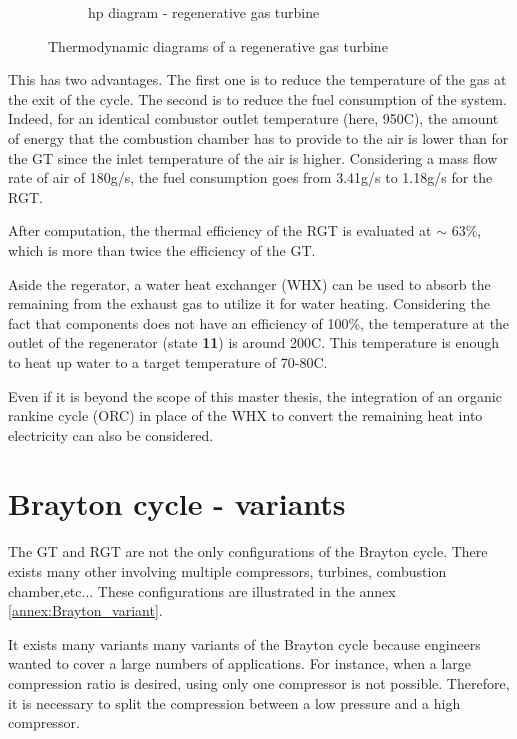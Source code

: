 \begin{figure}[h]
\begin{subfigure}[b]{0.4\textwidth}
         \caption{hp diagram - regenerative gas turbine}
         \label{fig:C4_hp_RGT}
     \end{subfigure}
        \caption{Thermodynamic diagrams of a regenerative gas turbine}
        \label{fig:C4_thermo_diagram_RGT}
\end{figure}
\newpage
This has two advantages. The first one is to reduce the temperature of the gas at the exit of the cycle. The second is to reduce the fuel consumption of the system. Indeed, for an identical combustor outlet temperature (here, 950\degree C), the amount of energy that the combustion chamber has to provide to the air is lower than for the GT since the inlet temperature of the air is higher. Considering a mass flow rate of air of 180g/s, the fuel consumption goes from 3.41g/s to 1.18g/s for the RGT.

After computation, the thermal efficiency of the RGT is evaluated at $\sim$ 63\%, which is more than twice the efficiency of the GT.

Aside the regerator, a water heat exchanger (WHX) can be used to absorb the remaining from the exhaust gas to utilize it for water heating. Considering the fact that components does not have an efficiency of 100\%, the temperature at the outlet of the regenerator (state \textbf{11}) is around 200\degree C. This temperature is enough to heat up water to a target temperature of 70-80\degree C.

Even if it is beyond the scope of this master thesis, the integration of an organic rankine cycle (ORC) in place of the WHX to convert the remaining heat into electricity can also be considered\citep{Quoilin2008}.

\section{Brayton cycle - variants}
The GT and RGT are not the only configurations of the Brayton cycle. There exists many other involving multiple compressors, turbines, combustion chamber,etc... These configurations are illustrated in the annex \ref{annex:Brayton_variant}.

It exists many variants many variants of the Brayton cycle because engineers wanted to cover a large numbers of applications. For instance, when a large compression ratio is desired, using only one compressor is not possible. Therefore, it is necessary to split the compression between a low pressure and a high compressor. 
